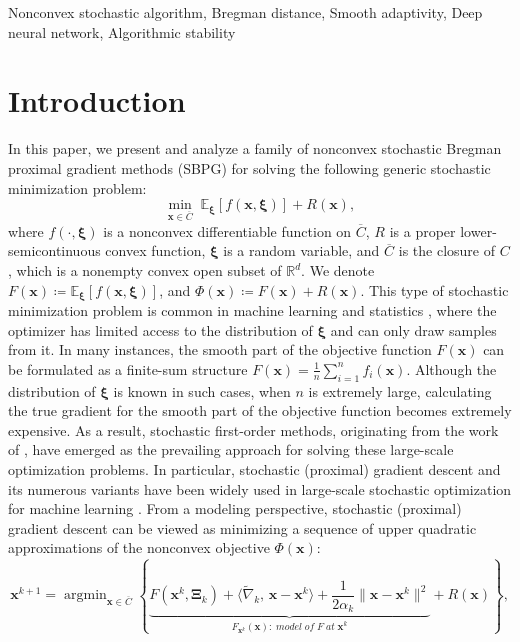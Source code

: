 \documentclass[twoside,11pt]{article}
\newcommand{\R}{\mathbb R}
\newcommand{\E}{\mathbb{E}}
\DeclareMathOperator*{\argmin}{argmin}
\def\inprod#1#2{\langle#1,\,#2\rangle}
\def\vx{{\bm{x}}}
\begin{document}
\begin{keywords}
Nonconvex stochastic algorithm, Bregman distance, Smooth adaptivity, Deep neural network, Algorithmic stability
\end{keywords}

\section{Introduction}\label{sec-introduction}
In this paper, we present and analyze a family of nonconvex stochastic Bregman proximal gradient methods (SBPG) for solving the following generic stochastic minimization problem:
\begin{equation}
\min_{\vx\in \overline{C}}\;\E_{{\bm\xi}}[f(\vx,{\bm\xi})]+R(\vx),
\label{min-prob}
\end{equation}
where $f(\cdot,{\bm\xi})$ is a nonconvex differentiable function on $\overline{C}$, $R$ is a proper lower-semicontinuous convex function, ${\bm\xi}$ is a random variable, and $\overline{C}$ is the closure of $C$, which is a nonempty convex open subset of $\R^d$. We denote $F(\vx)\coloneqq\E_{{\bm\xi}}[f(\vx,{\bm\xi})]$, and $\Phi(\vx)\coloneqq F(\vx)+R(\vx)$. This type of stochastic minimization problem is common in machine learning and statistics \citep{hastie2009elements, shapiro2021lectures, zhang2004solving}, where the optimizer has limited access to the distribution of $\bm\xi$ and can only draw samples from it. In many instances, the smooth part of the objective function $F(\vx)$ can be formulated as a finite-sum structure $F(\vx)=\frac{1}{n}\sum_{i=1}^nf_i(\vx)$. Although the distribution of $\bm\xi$ is known in such cases, when $n$ is extremely large, calculating the true gradient for the smooth part of the objective function becomes extremely expensive. As a result, stochastic first-order methods, originating from the work of \citet{robbins1951stochastic}, have emerged as the prevailing approach for solving these large-scale optimization problems. In particular, stochastic (proximal) gradient descent and its numerous variants \citep{duchi2011adaptive,duchi2009efficient,gu2020unified,kingma2014adam,JMLR:v18:16-410,wang2022riemannian} have been widely used in large-scale stochastic optimization for machine learning \citep{lecun2015deep,shapiro2021lectures,zhang2004solving}. From a modeling perspective, stochastic (proximal) gradient descent can be viewed as minimizing a sequence of upper quadratic approximations of the nonconvex objective $\Phi(\vx)$:
\begin{equation}
{\vx^{k+1}}=\argmin_{\vx\in \overline{C}}\left\{\underbrace{F({\vx^k},{\bm\Xi}_{k})+\inprod{\widetilde\nabla_k}{\vx-{\vx^k}}+\frac{1}{2\alpha_k}\|\vx-{\vx^k}\|^2}_{F_{{\vx^k}}(\vx):\;model\;of\;F\;at\;{\vx^k}}+R(\vx)\right\},
\label{convention-model} 
\end{equation}
\end{document}
